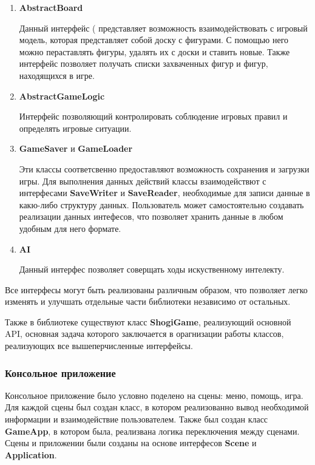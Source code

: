 	\begin{enumerate}
	\item \textbf{AbstractBoard}
	
	Данный интерфейс ( представляет возможность взаимодействовать с игровый модель, которая представляет собой доску с фигурами. С помощью него можно пераставлять фигуры, удалять их с доски и ставить новые. Также интерфейс позволяет получать списки захваченных фигур и фигур, находящихся в игре.
	
	\item \textbf{AbstractGameLogic} 
	
	Интерфейс позволяющий контролировать соблюдение игровых правил и определять игровые ситуации.
	
	\item \textbf{GameSaver} и \textbf{GameLoader}
	
	Эти классы соответсвенно предоставляют возможность сохранения и загрузки игры. Для выполнения данных действий классы взаимодействют с интерфесами \textbf{SaveWriter} и \textbf{SaveReader}, необходимые для записи данные в какю-либо структуру данных. Пользователь может самостоятельно создавать реализации данных интефесов, что позволяет хранить данные в любом удобным для него формате.  
	
	\item \textbf{AI}
	
	Данный интерфес позволяет соверщать ходы искуственному интелекту. 
	\end{enumerate}

Все интерфесы могут быть реализованы различным образом, что позволяет легко изменять и улучшать отдельные части библиотеки независимо от остальных.

Также в библиотеке существуют класс \textbf{ShogiGame}, реализующий основной API, основная задача которого заключается в орагнизации работы классов, реализующих все вышеперчисленные интерфейсы.	
	
\subsubsection{Консольное приложение}

Консольное приложение было условно поделено на сцены: меню, помощь, игра. Для каждой сцены был создан класс, в котором реализованно вывод необходимой информации и взаимодействие пользователем. Также был создан класс \textbf{GameApp}, в котором была, реализвана логика переключения между сценами. Сцены и приложении были созданы на основе интерфесов \textbf{Scene} и \textbf{Application}. 

